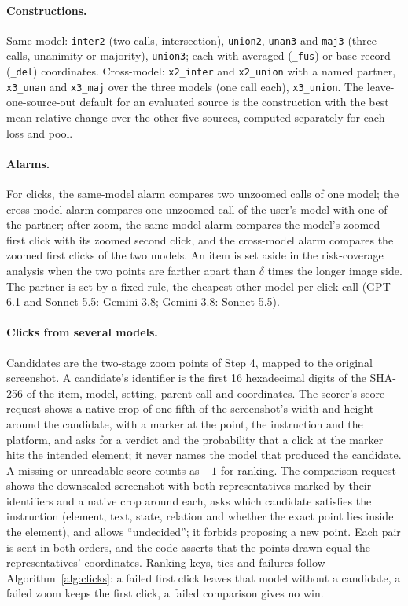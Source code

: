 \paragraph{Constructions.} Same-model: \texttt{inter2} (two calls, intersection), \texttt{union2}, \texttt{unan3} and \texttt{maj3} (three calls, unanimity or majority), \texttt{union3}; each with averaged (\texttt{\_fus}) or base-record (\texttt{\_del}) coordinates. Cross-model: \texttt{x2\_inter} and \texttt{x2\_union} with a named partner, \texttt{x3\_unan} and \texttt{x3\_maj} over the three models (one call each), \texttt{x3\_union}. The leave-one-source-out default for an evaluated source is the construction with the best mean relative change over the other five sources, computed separately for each loss and pool.

\paragraph{Alarms.} For clicks, the same-model alarm compares two unzoomed calls of one model; the cross-model alarm compares one unzoomed call of the user's model with one of the partner; after zoom, the same-model alarm compares the model's zoomed first click with its zoomed second click, and the cross-model alarm compares the zoomed first clicks of the two models. An item is set aside in the risk-coverage analysis when the two points are farther apart than $\delta$ times the longer image side. The partner is set by a fixed rule, the cheapest other model per click call (GPT-6.1 and Sonnet 5.5: Gemini 3.8; Gemini 3.8: Sonnet 5.5).

\paragraph{Clicks from several models.} Candidates are the two-stage zoom points of Step 4, mapped to the original screenshot. A candidate's identifier is the first 16 hexadecimal digits of the SHA-256 of the item, model, setting, parent call and coordinates. The scorer's score request shows a native crop of one fifth of the screenshot's width and height around the candidate, with a marker at the point, the instruction and the platform, and asks for a verdict and the probability that a click at the marker hits the intended element; it never names the model that produced the candidate. A missing or unreadable score counts as $-1$ for ranking. The comparison request shows the downscaled screenshot with both representatives marked by their identifiers and a native crop around each, asks which candidate satisfies the instruction (element, text, state, relation and whether the exact point lies inside the element), and allows ``undecided''; it forbids proposing a new point. Each pair is sent in both orders, and the code asserts that the points drawn equal the representatives' coordinates. Ranking keys, ties and failures follow Algorithm~\ref{alg:clicks}: a failed first click leaves that model without a candidate, a failed zoom keeps the first click, a failed comparison gives no win.

